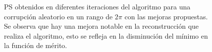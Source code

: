 \begin{figure}[ht!]
	\centering
	\caption[Espectro de potencia obtenido en diferentes iteraciones del algoritmo de optimización]{PS obtenidos en diferentes iteraciones del algoritmo para una corrupción aleatorio en un rango de $2\pi$ con las mejoras propuestas. Se observa que hay una mejora notable en la reconstrucción que realiza el algoritmo, esto se refleja en la disminución del mínimo en la función de mérito.}
	\label{fig:ps_final}
\end{figure}


